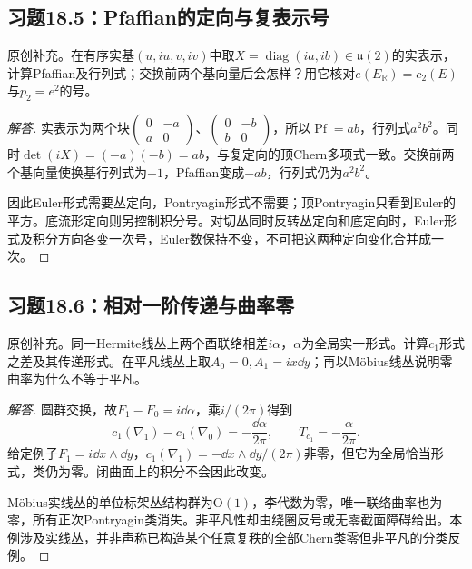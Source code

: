 \subsection*{习题18.5：Pfaffian的定向与复表示号}
原创补充。在有序实基$(u,iu,v,iv)$中取$X=\operatorname{diag}(ia,ib)\in\mathfrak u(2)$的实表示，计算Pfaffian及行列式；交换前两个基向量后会怎样？用它核对$e(E_{\mathbb R})=c_2(E)$与$p_2=e^2$的号。
\begin{proof}[解答]
实表示为两个块$\left(\begin{smallmatrix}0&-a\\a&0\end{smallmatrix}\right)$、$\left(\begin{smallmatrix}0&-b\\b&0\end{smallmatrix}\right)$，所以$\operatorname{Pf}=ab$，行列式$a^2b^2$。同时$\det(iX)=(-a)(-b)=ab$，与复定向的顶Chern多项式一致。交换前两个基向量使换基行列式为$-1$，Pfaffian变成$-ab$，行列式仍为$a^2b^2$。

因此Euler形式需要丛定向，Pontryagin形式不需要；顶Pontryagin只看到Euler的平方。底流形定向则另控制积分号。对切丛同时反转丛定向和底定向时，Euler形式及积分方向各变一次号，Euler数保持不变，不可把这两种定向变化合并成一次。
\end{proof}

\subsection*{习题18.6：相对一阶传递与曲率零}
原创补充。同一Hermite线丛上两个酉联络相差$i\alpha$，$\alpha$为全局实一形式。计算$c_1$形式之差及其传递形式。在平凡线丛上取$A_0=0,A_1=ix\dd y$；再以M\"obius线丛说明零曲率为什么不等于平凡。
\begin{proof}[解答]
圆群交换，故$F_1-F_0=i\dd\alpha$，乘$i/(2\pi)$得到
\[
 c_1(\nabla_1)-c_1(\nabla_0)
 =-\frac{\dd\alpha}{2\pi},\qquad T_{c_1}=-\frac\alpha{2\pi}.
\]
给定例子$F_1=i\dd x\wedge\dd y$，$c_1(\nabla_1)=-\dd x\wedge\dd y/(2\pi)$非零，但它为全局恰当形式，类仍为零。闭曲面上的积分不会因此改变。

M\"obius实线丛的单位标架丛结构群为$\mathrm O(1)$，李代数为零，唯一联络曲率也为零，所有正次Pontryagin类消失。非平凡性却由绕圈反号或无零截面障碍给出。本例涉及实线丛，并非声称已构造某个任意复秩的全部Chern类零但非平凡的分类反例。
\end{proof}

